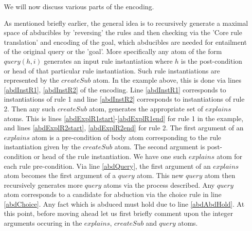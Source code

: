 \documentclass[sigconf]{acmart}
\begin{document}
We will now discuss various parts of the encoding.

As mentioned briefly earlier, the general idea is to recursively generate a
maximal space of abducibles by 'reversing' the rules and then checking via the
'Core rule translation' and encoding of the goal, which abducibles are needed
for entailment of the original query or the 'goal'. More specifically any atom
of the form $query(h,i)$ generates an input rule instantiation where $h$ is
the post-condition or head of that particular rule instantiation. Such rule
instantiations are represented by the $createSub$ atom. In the example above,
this is done via lines \ref{abdInstR1}, \ref{abdInstR2} of the encoding. Line \ref{abdInstR1} corresponds to
instantiations of rule 1 and line \ref{abdInstR2} corresponds to instantiations of rule
2. Then any such $createSub$ atom, generates the appropriate set of $explains$
atoms. This is lines \ref{abdExplR1start}-\ref{abdExplR1end} for rule 1 in the example, and lines \ref{abdExplR2start}, \ref{abdExplR2end} for
rule 2. The first argument of an $explains$ atom is a pre-condition of body
atom corresponding to the rule instantiation given by the $createSub$
atom. The second argument is post-condition or head of the rule
instantiation. We have one such $explains$ atom for each rule
pre-condition. Via line \ref{abdQuery}, the first argument of an $explains$ atom becomes
the first argument of a $query$ atom. This new $query$ atom then recursively
generates more $query$ atoms via the process described. Any $query$ atom
corresponds to a candidate for abduction via the choice rule in line \ref{abdChoice}. Any
fact which is abduced must hold due to line \ref{abdAbdHold}. At this point, before moving
ahead let us first briefly comment upon the integer arguments occuring in the
$explains$, $createSub$ and $query$ atoms.
\end{document}
